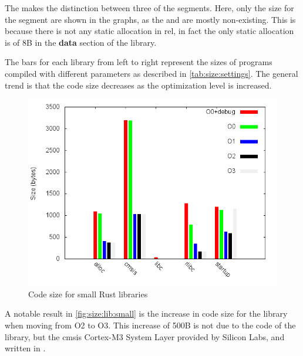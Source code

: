 The  makes the distinction between three of the {\elf} segments.
Here, only the size for the  segment are shown in the graphs, as the  and  are mostly non-existing.
This is because there is not any static allocation in \gls{rel}, in fact the only static allocation is of 8B in the \textbf{data} section of the  library.

The bars for each library from left to right represent the sizes of programs compiled with different parameters as described in \autoref{tab:size:settings}.
The general trend is that the code size decreases as the optimization level is increased.

\begin{figure}[H]
  \begin{center}
    \includegraphics[scale=0.5]{results/plots/size/lib/small/size.png}
  \end{center}
  \caption{Code size for small Rust libraries}
  \label{fig:size:lib:small}
\end{figure}

A notable result in \autoref{fig:size:lib:small} is the increase in code size for the  library when moving from O2 to O3.
This increase of 500B is not due to the {\rust} code of the  library, but the \gls{cmsis} Cortex-M3 System Layer provided by Silicon Labs, and written in {\C}.

